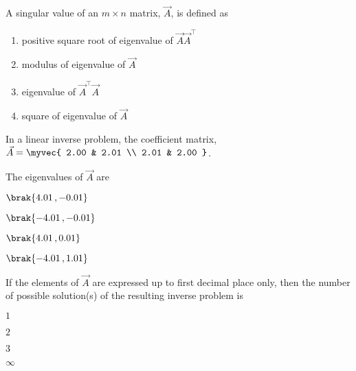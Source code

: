         \item A singular value of an $m \times n$ matrix, $\vec{A}$, is defined as \hfill{}
            \begin{enumerate}
                    \item positive square root of eigenvalue of $\vec{A}\vec{A}^{\top}$
                    \item modulus of eigenvalue of $\vec{A}$
                    \item eigenvalue of $\vec{A}^{\top}\vec{A}$
                    \item square of eigenvalue of $\vec{A}$
            \end{enumerate}
In a linear inverse problem, the coefficient matrix, $\vec{A} = \myvec{ 2.00 & 2.01 \\ 2.01 & 2.00 }$.

        \item The eigenvalues of $\vec{A}$ are \hfill{}
            \begin{enumerate}
                \begin{multicols}{4}
                    \item $\brak{4.01\,, -0.01}$
                    \item $\brak{-4.01\,,-0.01}$
                    \item $\brak{4.01\,,0.01}$
                    \item $\brak{-4.01\,,1.01}$
                \end{multicols}
            \end{enumerate}
        
        \item If the elements of $\vec{A}$ are expressed up to first decimal place only, then the number of possible solution(s) of the resulting inverse problem is \hfill{}
            \begin{enumerate}
                \begin{multicols}{4}
                    \item $1$
                    \item $2$
                    \item $3$
                    \item $\infty$
                \end{multicols}
            \end{enumerate}

